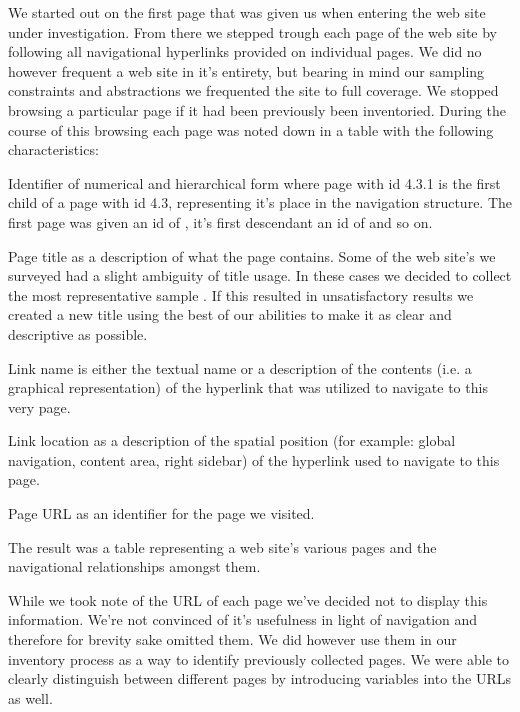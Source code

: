 We started out on the first page that was given us when entering the web site
under investigation. From there we stepped trough each page of the web site
by following all navigational hyperlinks provided on individual pages.
We did no however frequent a web site in it's entirety, but bearing in mind
our sampling constraints and abstractions we frequented the site to full
coverage. We stopped browsing a particular page if it%
had been previously been inventoried. During the course of this browsing
each page was noted down in a table with the following characteristics:

\begin{desc}
  \item[Identifier] of numerical and hierarchical form where page with id
    4.3.1 is the first child of a page with id 4.3, representing it's place in
    the navigation structure. The first page was given an id of ,
    it's first descendant an id of  and so on.
  \item[Page title] as a description of what the page contains. Some of the
    web site's we surveyed had a slight ambiguity of title usage. In these
    cases we decided to collect the most representative sample%
    .
    If this resulted in unsatisfactory results we created a new title using
    the best of our abilities to make it as clear and descriptive as possible.
  \item[Link name] is either the textual name or a description of the
    contents (i.e. a graphical representation) of the hyperlink that was
    utilized to navigate to this very page.
  \item[Link location] as a description of the spatial position
    (for example: global navigation, content area, right sidebar) of the
    hyperlink used to navigate to this page.
  \item[Page URL] as an identifier for the page we visited.
\end{desc}

The result was a table representing a web site's various pages and the
navigational relationships amongst them.

While we took note of the URL of each page we've decided not to display this
information. We're not convinced of it's usefulness in light of navigation
and therefore for brevity sake omitted them. We did however use them in our
inventory process as a way to identify previously collected pages.
We were able to clearly distinguish between different pages
by introducing variables into the URLs as well.

